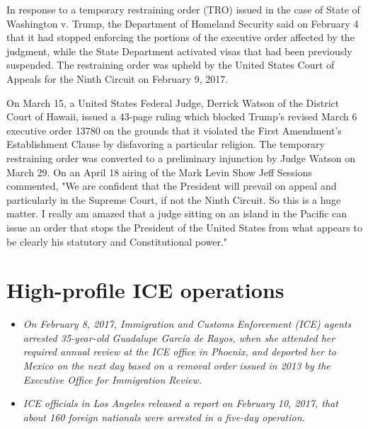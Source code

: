 In response to a temporary restraining order (TRO) issued in the case of
State of Washington v. Trump, the Department of Homeland Security said
on February 4 that it had stopped enforcing the portions of the
executive order affected by the judgment, while the State Department
activated visas that had been previously suspended. The restraining
order was upheld by the United States Court of Appeals for the Ninth
Circuit on February 9, 2017.

On March 15, a United States Federal Judge, Derrick Watson of the
District Court of Hawaii, issued a 43-page ruling which blocked Trump's
revised March 6 executive order 13780 on the grounds that it violated
the First Amendment's Establishment Clause by disfavoring a particular
religion. The temporary restraining order was converted to a preliminary
injunction by Judge Watson on March 29. On an April 18 airing of the
Mark Levin Show Jeff Sessions commented, "We are confident that the
President will prevail on appeal and particularly in the Supreme Court,
if not the Ninth Circuit. So this is a huge matter. I really am amazed
that a judge sitting on an island in the Pacific can issue an order that
stops the President of the United States from what appears to be clearly
his statutory and Constitutional power."

\section{High-profile ICE operations}\label{high-profile-ice-operations}

\begin{itemize}
\item
  \emph{On February 8, 2017, Immigration and Customs Enforcement (ICE)
  agents arrested 35-year-old Guadalupe García de Rayos, when she
  attended her required annual review at the ICE office in Phoenix, and
  deported her to Mexico on the next day based on a removal order issued
  in 2013 by the Executive Office for Immigration Review.}
\item
  \emph{ICE officials in Los Angeles released a report on February 10,
  2017, that about 160 foreign nationals were arrested in a five-day
  operation.}
\end{itemize}

